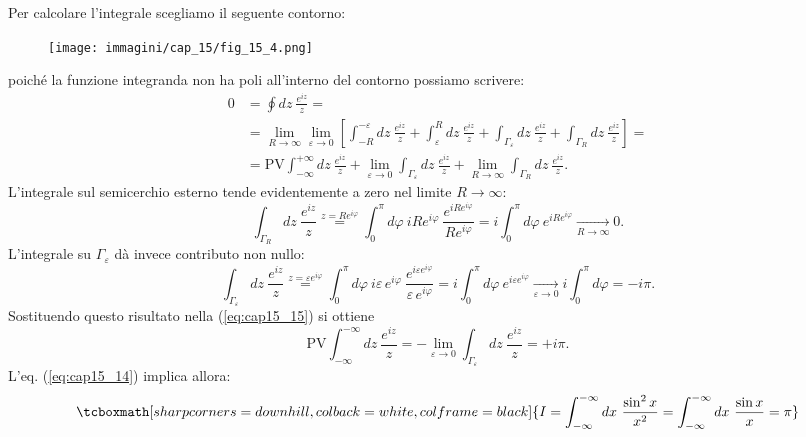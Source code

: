 Per calcolare l'integrale scegliamo il seguente contorno:
\begin{figure}[!htbp]
\begin{center}
\texttt{[image: immagini/cap\_15/fig\_15\_4.png]}
\end{center}
\end{figure}
poiché la funzione integranda non ha poli all'interno del contorno possiamo scrivere:
	\begin{align}
		0 & =  \oint  dz\ \frac{e^{iz}}{z} = \nonumber \\
		&= \lim _{R\rightarrow \infty} \lim _{\varepsilon\rightarrow 0} \left[ \int _{-R} ^{-\varepsilon}dz\ \frac{e^{iz}}{z}+\int _{\varepsilon} ^{R}dz\ \frac{e^{iz}}{z}+\int _{\Gamma _{\varepsilon}} dz\ \frac{e^{iz}}{z} +\int _{\Gamma _{R}} dz\ \frac{e^{iz}}{z}\right] = \nonumber\\
		&= \textrm{PV}\int _{-\infty} ^{+\infty}dz\ \frac{e^{iz}}{z}+ \lim _{\varepsilon\rightarrow 0}  \int _{\Gamma _{\varepsilon}} dz\ \frac{e^{iz}}{z}+\lim _{R\rightarrow \infty}\int _{\Gamma _{R}} dz\ \frac{e^{iz}}{z}.
	\label{eq:cap15_15}
	\end{align}
L'integrale sul semicerchio esterno tende evidentemente a zero nel limite $R\rightarrow \infty $:
	\begin{equation}
		\int _{\Gamma _{R}} dz\ \frac{e^{iz}}{z} \overset{z= Re^{i\varphi}}{=} \int _0 ^{\pi} d\varphi \ i R e^{i\varphi}\ \frac{e^{iRe^{i\varphi}}}{Re^{i\varphi}} = i\int _0 ^{\pi} d\varphi \ e^{iRe^{i\varphi}} \underset{R\rightarrow \infty}{\longrightarrow}0.
	\end{equation}
L'integrale su $\Gamma _{\varepsilon}$ dà invece contributo non nullo:
	\begin{equation}
		\int _{\Gamma _{\varepsilon}} dz\ \frac{e^{iz}}{z} \overset{z= \varepsilon e^{i\varphi}}{=} \int _0 ^{\pi} d\varphi \ i \varepsilon\, e^{i\varphi}\ \frac{e^{i\varepsilon  e^{i\varphi}}}{\varepsilon\, e^{i\varphi}} =  i\int _0 ^{\pi} d\varphi \ e^{i\varepsilon e^{i\varphi}} \underset{\varepsilon\rightarrow 0}{\longrightarrow}i\int _0 ^{\pi} d\varphi = -i\pi.
	\end{equation}
Sostituendo questo risultato nella (\ref{eq:cap15_15}) si ottiene
	\begin{equation}
		\textrm{PV} \int _{-\infty} ^{-\infty} dz\ \frac{e^{iz}}{z} =-\lim _{\varepsilon \rightarrow 0} \int _{\Gamma _{\varepsilon}} dz\ \frac{e^{iz}}{z}= +i\pi.
	\end{equation}
L'eq. (\ref{eq:cap15_14}) implica allora:
	\begin{equation}
		\tcboxmath[sharp corners=downhill, colback=white, colframe=black]{
			I= \int _{-\infty} ^{-\infty} dx\ \frac{\sin ^2  x}{x^2}= \int _{-\infty} ^{-\infty} dx\ \frac{\sin  x}{x}= \pi
			}
	\end{equation}
\newpage
